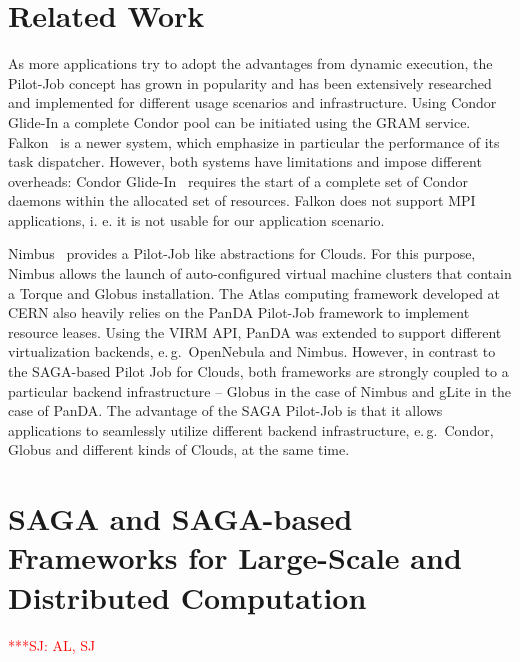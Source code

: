 \documentclass[conference,final]{IEEEtran}
\newcommand{\jhanote}[1]{ {\textcolor{red} { ***SJ: #1 }}}
\newcommand{\jhanote}[1]{}
\begin{document}
\section{Related Work} %

As more applications try to adopt the advantages from dynamic
execution, the Pilot-Job concept has grown in popularity and has been
extensively researched and implemented for different usage scenarios
and infrastructure. %
Using Condor Glide-In a complete Condor pool can be initiated using
the GRAM service.  Falkon~\cite{1362680} is a newer system, which
emphasize in particular the performance of its task
dispatcher. However, both systems have limitations and impose
different overheads: Condor Glide-In~\cite{citeulike:291860} requires
the start of a complete set of Condor daemons within the allocated set
of resources. Falkon does not support MPI applications, i. e. it is
not usable for our application scenario.

Nimbus~\cite{10.1109/MIC.2009.94} provides a Pilot-Job like
abstractions for Clouds. For this purpose, Nimbus allows the launch of
auto-configured virtual machine clusters that contain a Torque and
Globus installation.  The Atlas computing framework developed at CERN
also heavily relies on the PanDA Pilot-Job framework to implement
resource leases. Using the VIRM API, PanDA was extended to support
different virtualization backends, e.\,g.\ OpenNebula and
Nimbus. However, in contrast to the SAGA-based Pilot
Job for Clouds, both frameworks are strongly coupled to a particular
backend infrastructure -- Globus in the case of Nimbus and gLite in
the case of PanDA. The advantage of the SAGA Pilot-Job is that it
allows applications to seamlessly utilize different backend
infrastructure, e.\,g.\ Condor, Globus and different kinds of Clouds,
at the same time.




\section{SAGA and SAGA-based Frameworks for Large-Scale and
  Distributed Computation} \jhanote{AL, SJ}
\end{document}
